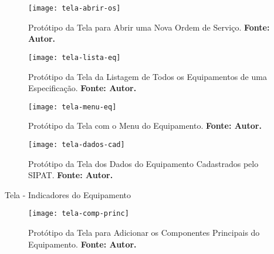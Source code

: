 \begin{apendicesenv}


\graphicspath{{figuras/prototipos/}}
\begin{figure}[H]
\centering
\texttt{[image: tela-abrir-os]}
\caption{Protótipo da Tela para Abrir uma Nova Ordem de Serviço. \textbf{Fonte: Autor.}}
\label{tela-abrir-os}
\end{figure}


\graphicspath{{figuras/prototipos/}}
\begin{figure}[H]
\centering
\texttt{[image: tela-lista-eq]}
\caption{Protótipo da Tela da Listagem de Todos os Equipamentos de uma Especificação. \textbf{Fonte: Autor.}}
\label{tela-lista-eq}
\end{figure}



\graphicspath{{figuras/prototipos/}}
\begin{figure}[H]
\centering
\texttt{[image: tela-menu-eq]}
\caption{Protótipo da Tela com o Menu do Equipamento. \textbf{Fonte: Autor.}}
\label{tela-menu-eq}
\end{figure}


\graphicspath{{figuras/prototipos/}}
\begin{figure}[H]
\centering
\texttt{[image: tela-dados-cad]}
\caption{Protótipo da Tela dos Dados do Equipamento Cadastrados pelo SIPAT. \textbf{Fonte: Autor.}}
\label{tela-dados-cad}
\end{figure}



Tela - Indicadores do Equipamento





\graphicspath{{figuras/prototipos/}}
\begin{figure}[H]
\centering
\texttt{[image: tela-comp-princ]}
\caption{Protótipo da Tela para Adicionar os Componentes Principais do Equipamento. \textbf{Fonte: Autor.}}
\label{tela-comp-princ}
\end{figure}




\end{apendicesenv}
